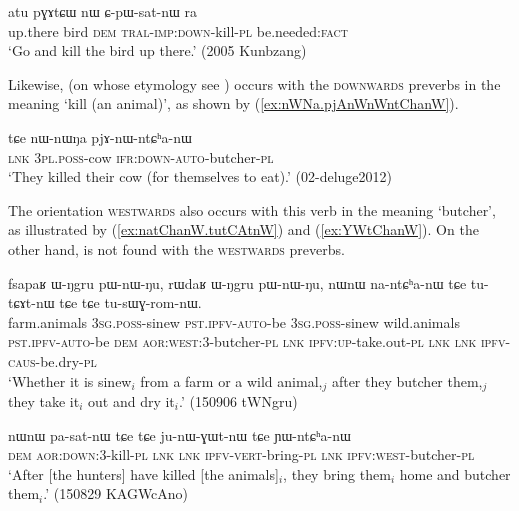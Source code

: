 \begin{exe}
\ex \label{ex:pGAtCW.CpWsatnW}
\gll  atu pɣɤtɕɯ nɯ ɕ-pɯ-sat-nɯ ra \\
up.there bird \textsc{dem} \textsc{tral}-\textsc{imp}:\textsc{down}-kill-\textsc{pl} be.needed:\textsc{fact} \\
\glt `Go and kill the bird up there.' (2005 Kunbzang)
   \end{exe} 
   
Likewise,  (on whose etymology see \citealt[303--309]{gong18these}) occurs with the \textsc{downwards} preverbs in the meaning `kill (an animal)', as shown by (\ref{ex:nWNa.pjAnWnWntChanW}). 

\begin{exe}
\ex \label{ex:nWNa.pjAnWnWntChanW}
\gll  tɕe nɯ-nɯŋa pjɤ-nɯ-ntɕʰa-nɯ \\
\textsc{lnk} \textsc{3pl}.\textsc{poss}-cow \textsc{ifr}:\textsc{down}-\textsc{auto}-butcher-\textsc{pl} \\
\glt `They killed their cow (for themselves to eat).' (02-deluge2012) 
\end{exe} 

The orientation \textsc{westwards} also occurs with this verb in the meaning `butcher', as illustrated by (\ref{ex:natChanW.tutCAtnW}) and (\ref{ex:YWtChanW}). On the other hand,  is not found with the \textsc{westwards} preverbs.

\begin{exe}
\ex \label{ex:natChanW.tutCAtnW}
\gll fsapaʁ ɯ-ŋgru pɯ-nɯ-ŋu, rɯdaʁ ɯ-ŋgru pɯ-nɯ-ŋu,  nɯnɯ na-ntɕʰa-nɯ tɕe tu-tɕɤt-nɯ tɕe tɕe tu-sɯɣ-rom-nɯ. \\
farm.animals \textsc{3sg}.\textsc{poss}-sinew  \textsc{pst}.\textsc{ipfv}-\textsc{auto}-be  \textsc{3sg}.\textsc{poss}-sinew  wild.animals \textsc{pst}.\textsc{ipfv}-\textsc{auto}-be \textsc{dem} \textsc{aor}:\textsc{west}:3\flobv{}-butcher-\textsc{pl} \textsc{lnk} \textsc{ipfv}:\textsc{up}-take.out-\textsc{pl} \textsc{lnk} \textsc{lnk} \textsc{ipfv}-\textsc{caus}-be.dry-\textsc{pl} \\
\glt `Whether it is sinew$_i$ from a farm or a wild animal,$_j$  after they butcher them,$_j$ they take it$_i$ out and dry it$_i$.' (150906 tWNgru) 
\end{exe} 

\begin{exe}
\ex \label{ex:YWtChanW}
\gll nɯnɯ pa-sat-nɯ tɕe tɕe ju-nɯ-ɣɯt-nɯ tɕe ɲɯ-ntɕʰa-nɯ  \\
\textsc{dem} \textsc{aor}:\textsc{down}:3\flobv{}-kill-\textsc{pl} \textsc{lnk} \textsc{lnk} \textsc{ipfv}-\textsc{vert}-bring-\textsc{pl} \textsc{lnk} \textsc{ipfv}:\textsc{west}-butcher-\textsc{pl} \\
\glt `After [the hunters] have killed [the animals]$_i$, they bring them$_i$ home and butcher them$_i$.' (150829 KAGWcAno) 
\end{exe} 

